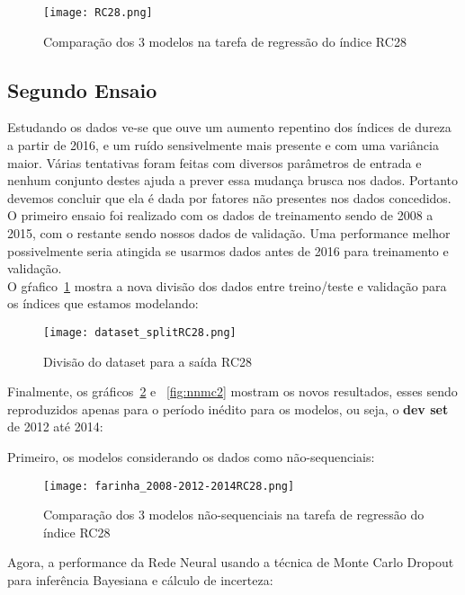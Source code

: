 \begin{figure}[H]
\centering
\texttt{[image: RC28.png]}
\caption{Comparação dos 3 modelos na tarefa de regressão do índice RC28}
\end{figure}

\subsection{Segundo Ensaio}

Estudando os dados ve-se que ouve um aumento repentino dos índices de dureza a
partir de 2016, e um ruído sensivelmente mais presente e com uma variância
maior. Várias tentativas foram feitas com diversos parâmetros de entrada e
nenhum conjunto destes ajuda a prever essa mudança brusca nos dados. Portanto
devemos concluir que ela é dada por fatores não presentes nos dados concedidos.
O primeiro ensaio foi realizado com os dados de treinamento sendo de 2008 a
2015, com o restante sendo nossos dados de validação. Uma performance melhor
possivelmente seria atingida se usarmos dados antes de 2016 para treinamento e
validação. \\  


O gŕafico~\ref{fig:divrc28} mostra a nova divisão dos dados entre treino/teste e validação para os índices que estamos modelando:



\begin{figure}[H]
  \centering
\texttt{[image: dataset\_splitRC28.png]}
\caption{Divisão do dataset para a saída RC28}
  \label{fig:divrc28}
\end{figure}


Finalmente, os gráficos~\ref{fig:3nseq} e ~\ref{fig:nnmc2} mostram os novos resultados, esses sendo reproduzidos apenas para o período inédito para os modelos, ou seja, o \textbf{dev set} de 2012 até 2014:

Primeiro, os modelos considerando os dados como não-sequenciais:

\begin{figure}[H]
\centering
\texttt{[image: farinha\_2008-2012-2014RC28.png]}
\caption{Comparação dos 3 modelos não-sequenciais na tarefa de regressão do índice RC28}
\label{fig:3nseq}
\end{figure}


Agora, a performance da Rede Neural usando a técnica de Monte Carlo Dropout para inferência Bayesiana e cálculo de incerteza:


